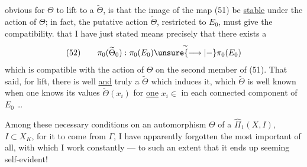 obvious for $\Theta$ to lift to a $\widetilde{\Theta}$, is that the image of the map (51) be \uline{stable} under the action of $\Theta$; in fact, the putative action $\widetilde{\Theta}$, restricted to $E_0$, must give the compatibility.     that I have just stated means precisely that there exists a  
\[
(52)\qquad \pi_0(\widetilde{\Theta}_0):\pi_0(E_0)\overset{\sim}{\unsure{\longrightarrow|\mathbin{-}}}\pi_0(E_0)
\]
 which is compatible with the action of $\Theta$ on the second member of (51). That said, for  lift, there is well  \uline{and} truly a $\widetilde{\Theta}$ which induces it,  which $\widetilde{\Theta}$ is well known when one knows its values $\widetilde{\Theta}(x_i)$  for \uline{one} $x_i\in$   in each connected component of $E_0$ \ldots

Among these  necessary conditions on an automorphism $\Theta$ of a $\widehat{\Pi}_1(X,I)$, $I\subset X_K$, for it to come from $\Gamma$, I have apparently forgotten the most important of all, with which I  work constantly --- to such an extent that it ends up seeming self-evident!
